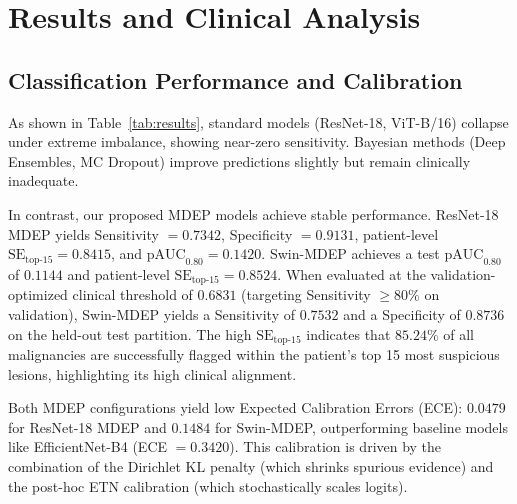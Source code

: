 \documentclass[letterpaper]{article} %
\begin{document}
\section{Results and Clinical Analysis}\label{sec:results}

\subsection{Classification Performance and Calibration}
As shown in Table~\ref{tab:results}, standard models (ResNet-18, ViT-B/16) collapse under extreme imbalance, showing near-zero sensitivity. Bayesian methods (Deep Ensembles, MC Dropout) improve predictions slightly but remain clinically inadequate. 

In contrast, our proposed MDEP models achieve stable performance. ResNet-18 MDEP yields Sensitivity $= 0.7342$, Specificity $= 0.9131$, patient-level $\text{SE}_{\text{top-15}} = 0.8415$, and $\text{pAUC}_{0.80} = 0.1420$. Swin-MDEP achieves a test $\text{pAUC}_{0.80}$ of $0.1144$ and patient-level $\text{SE}_{\text{top-15}} = 0.8524$. When evaluated at the validation-optimized clinical threshold of $0.6831$ (targeting Sensitivity $\ge 80\%$ on validation), Swin-MDEP yields a Sensitivity of $0.7532$ and a Specificity of $0.8736$ on the held-out test partition. The high $\text{SE}_{\text{top-15}}$ indicates that $85.24\%$ of all malignancies are successfully flagged within the patient's top 15 most suspicious lesions, highlighting its high clinical alignment.

Both MDEP configurations yield low Expected Calibration Errors (ECE): $0.0479$ for ResNet-18 MDEP and $0.1484$ for Swin-MDEP, outperforming baseline models like EfficientNet-B4 (ECE $= 0.3420$). This calibration is driven by the combination of the Dirichlet KL penalty (which shrinks spurious evidence) and the post-hoc ETN calibration (which stochastically scales logits).
\end{document}
